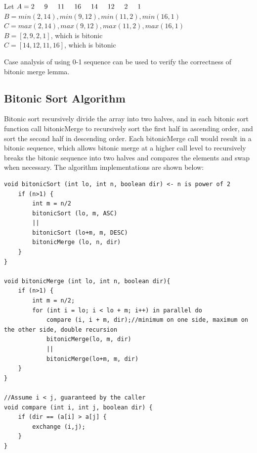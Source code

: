 \documentclass[twoside]{article}
\begin{document}
Let $A = 2\hspace{0.5cm}9\hspace{0.5cm}11\hspace{0.5cm}16\hspace{0.5cm}14\hspace{0.5cm}12\hspace{0.5cm}2\hspace{0.5cm}1\hspace{0.5cm}$\\

$B = min(2,14),min(9,12),min(11,2),min(16,1)$\\

$C = max(2,14),max(9,12),max(11,2),max(16,1)$\\

$B=[2,9,2,1]$, which is bitonic \\
$C=[14,12,11,16]$, which is bitonic

Case analysis of using 0-1 sequence can be used to verify the correctness of bitonic merge lemma. 


\subsection{Bitonic Sort Algorithm}

Bitonic sort recursively divide the array into two halves, and in each bitonic sort function call bitonicMerge to recursively sort the first half in ascending order, and sort the second half in descending order. Each bitonicMerge call would result in a bitonic sequence, which allows bitonic merge at a higher call level to recursively breaks the bitonic sequence into two halves and compares the elements and swap when necessary. The algorithm implementations are shown below:

\begin{lstlisting}
void bitonicSort (int lo, int n, boolean dir) <- n is power of 2
	if (n>1) {
		int m = n/2
		bitonicSort (lo, m, ASC)
		||
		bitonicSort (lo+m, m, DESC)
		bitonicMerge (lo, n, dir)
	}
}

void bitonicMerge (int lo, int n, boolean dir){
	if (n>1) {
		int m = n/2;
		for (int i = lo; i < lo + m; i++) in parallel do 
			compare (i, i + m, dir);//minimum on one side, maximum on the other side, double recursion
			bitonicMerge(lo, m, dir)
			||
			bitonicMerge(lo+m, m, dir)
	}
}

//Assume i < j, guaranteed by the caller
void compare (int i, int j, boolean dir) {
	if (dir == (a[i] > a[j] {
		exchange (i,j);
	}
}
\end{lstlisting}
\end{document}
